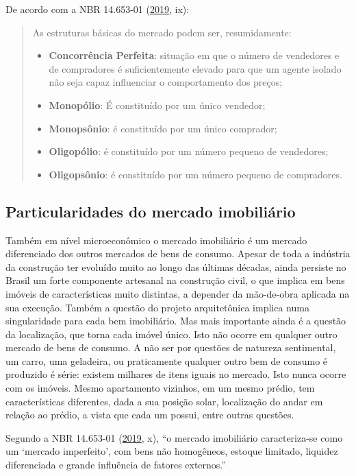 \documentclass[
	12pt,				%
	oneside,			%
	a4paper,			%
	chapter=TITLE,		%
	section=TITLE,		%
	english,			%
	brazil				%
	]{abntex2}
\begin{document}
De acordo com a NBR 14.653-01 (\protect\hyperlink{ref-NBR1465301}{2019}, ix):
\begin{quote}
As estruturas básicas do mercado podem ser, resumidamente:
\begin{itemize}
\item
  \textbf{Concorrência Perfeita}: situação em que o número de vendedores e de
  compradores é suficientemente elevado para que um agente isolado não seja
  capaz influenciar o comportamento dos preços;
\item
  \textbf{Monopólio}: É constituído por um único vendedor;
\item
  \textbf{Monopsônio}: é constituído por um único comprador;
\item
  \textbf{Oligopólio}: é constituído por um número pequeno de vendedores;
\item
  \textbf{Oligopsônio}: é constituído por um número pequeno de compradores.
\end{itemize}
\end{quote}
\hypertarget{particularidades-do-mercado-imobiliuxe1rio}{%
\subsection{Particularidades do mercado imobiliário}\label{particularidades-do-mercado-imobiliuxe1rio}}

Também em nível microeconômico o mercado imobiliário é um mercado diferenciado
dos outros mercados de bens de consumo. Apesar de toda a indústria da construção
ter evoluído muito ao longo das últimas décadas, ainda persiste no Brasil um
forte componente artesanal na construção civil, o que implica em bens imóveis
de características muito distintas, a depender da mão-de-obra aplicada na sua
execução. Também a questão do projeto arquitetônica implica numa singularidade
para cada bem imobiliário. Mas mais importante ainda é a questão da localização,
que torna cada imóvel único. Isto não ocorre em qualquer outro mercado de bens
de consumo. A não ser por questões de natureza sentimental, um carro, uma
geladeira, ou praticamente qualquer outro bem de consumo é produzido é série:
existem milhares de itens iguais no mercado. Isto nunca ocorre com os imóveis.
Mesmo apartamento vizinhos, em um mesmo prédio, tem características diferentes,
dada a sua posição solar, localização do andar em relação ao prédio, a vista
que cada um possui, entre outras questões.

Segundo a NBR 14.653-01 (\protect\hyperlink{ref-NBR1465301}{2019}, x), ``o mercado imobiliário caracteriza-se
como um `mercado imperfeito', com bens não homogêneos, estoque limitado, liquidez
diferenciada e grande influência de fatores externos.''
\end{document}
